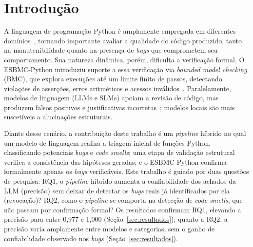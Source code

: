 \documentclass[sigconf]{acmart}
\begin{document}

\frenchspacing
\maketitle

\section{Introdução}

A linguagem de programação Python é amplamente empregada em diferentes domínios~\cite{tiobe2026}, tornando importante avaliar a qualidade do código produzido, tanto na manutenibilidade quanto na presença de \textit{bugs} que comprometem seu comportamento. Sua natureza dinâmica, porém, dificulta a verificação formal. O ESBMC-Python introduziu suporte a essa verificação via \textit{bounded model checking} (BMC), que explora execuções até um limite finito de passos, detectando violações de asserções, erros aritméticos e acessos inválidos~\cite{farias2024esbmcpython}. Paralelamente, modelos de linguagem (LLMs e SLMs) apoiam a revisão de código, mas produzem falsos positivos e justificativas incorretas~\cite{ding2025primevul}; modelos locais são mais suscetíveis a alucinações estruturais.


Diante desse cenário, a contribuição deste trabalho é um \textit{pipeline} híbrido no qual um modelo de linguagem realiza a triagem inicial de funções Python, classificando potenciais \textit{bugs} e \textit{code smells}; uma etapa de validação estrutural verifica a consistência das hipóteses geradas; e o ESBMC-Python confirma formalmente apenas os \textit{bugs} verificáveis. Este trabalho é guiado por duas questões de pesquisa: RQ1, o \textit{pipeline} híbrido aumenta a confiabilidade dos achados da LLM (precisão) sem deixar de detectar os \textit{bugs} reais já identificados por ela (revocação)? RQ2, como o \textit{pipeline} se comporta na detecção de \textit{code smells}, que não passam por confirmação formal? Os resultados confirmam RQ1, elevando a precisão para entre 0,977 e 1,000 (Seção~\ref{sec:resultados}); quanto a RQ2, a precisão varia amplamente entre modelos e categorias, sem o ganho de confiabilidade observado nos \textit{bugs} (Seção~\ref{sec:resultados}).
\end{document}
